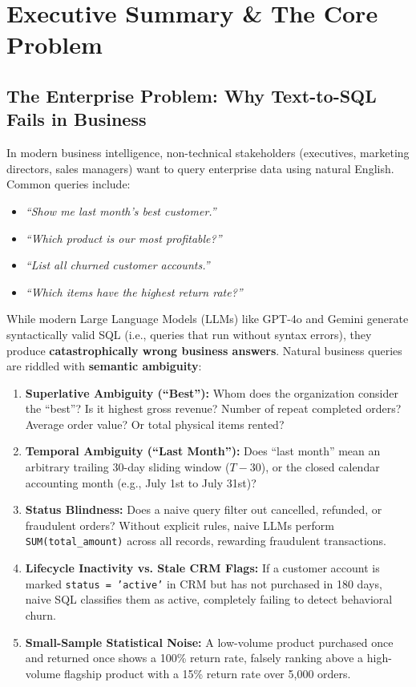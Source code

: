 \documentclass[10pt,a4paper]{article}
\begin{document}
\tableofcontents
\newpage

\section{Executive Summary \& The Core Problem}

\subsection{The Enterprise Problem: Why Text-to-SQL Fails in Business}
In modern business intelligence, non-technical stakeholders (executives, marketing directors, sales managers) want to query enterprise data using natural English. Common queries include:
\begin{itemize}[leftmargin=*]
    \item \textit{``Show me last month's best customer.''}
    \item \textit{``Which product is our most profitable?''}
    \item \textit{``List all churned customer accounts.''}
    \item \textit{``Which items have the highest return rate?''}
\end{itemize}

While modern Large Language Models (LLMs) like GPT-4o and Gemini generate syntactically valid SQL (i.e., queries that run without syntax errors), they produce \textbf{catastrophically wrong business answers}. Natural business queries are riddled with \textbf{semantic ambiguity}:
\begin{enumerate}
    \item \textbf{Superlative Ambiguity (``Best''):} Whom does the organization consider the ``best''? Is it highest gross revenue? Number of repeat completed orders? Average order value? Or total physical items rented?
    \item \textbf{Temporal Ambiguity (``Last Month''):} Does ``last month'' mean an arbitrary trailing 30-day sliding window ($T-30$), or the closed calendar accounting month (e.g., July 1st to July 31st)?
    \item \textbf{Status Blindness:} Does a naive query filter out cancelled, refunded, or fraudulent orders? Without explicit rules, naive LLMs perform \texttt{SUM(total\_amount)} across all records, rewarding fraudulent transactions.
    \item \textbf{Lifecycle Inactivity vs. Stale CRM Flags:} If a customer account is marked \texttt{status = 'active'} in CRM but has not purchased in 180 days, naive SQL classifies them as active, completely failing to detect behavioral churn.
    \item \textbf{Small-Sample Statistical Noise:} A low-volume product purchased once and returned once shows a 100\% return rate, falsely ranking above a high-volume flagship product with a 15\% return rate over 5,000 orders.
\end{enumerate}
\end{document}
